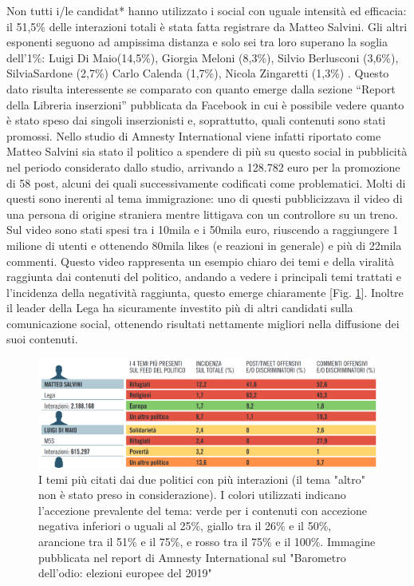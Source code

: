 Non tutti i/le candidat* hanno utilizzato i social con uguale intensità ed efficacia: il 51,5\% delle interazioni totali è stata fatta registrare da Matteo Salvini. Gli altri esponenti seguono ad ampissima distanza e solo sei tra loro superano la soglia dell’1\%: Luigi Di Maio(14,5\%), Giorgia Meloni (8,3\%), Silvio Berlusconi (3,6\%), SilviaSardone (2,7\%) Carlo Calenda (1,7\%), Nicola Zingaretti (1,3\%) . Questo dato risulta interessente se comparato con quanto emerge dalla sezione “Report della Libreria inserzioni” pubblicata da Facebook in cui è possibile vedere quanto è stato speso dai singoli inserzionisti e, soprattutto, quali contenuti sono stati promossi. Nello studio di Amnesty International viene infatti riportato come Matteo Salvini sia stato il politico a spendere di più su questo social in pubblicità nel periodo considerato dallo studio, arrivando a  128.782 euro per la promozione di 58 post, alcuni dei quali successivamente codificati come problematici. Molti di questi sono inerenti al tema immigrazione: uno di questi pubblicizzava il video di una persona di origine straniera mentre littigava con un controllore su un treno. Sul video sono stati spesi tra i 10mila e i 50mila euro, riuscendo a raggiungere 1 milione di utenti e ottenendo 80mila likes (e reazioni in generale) e più di 22mila commenti. Questo video rappresenta un esempio chiaro dei temi e della viralità raggiunta dai contenuti del politico, andando a vedere i principali temi trattati e l'incidenza della negatività raggiunta, questo emerge chiaramente [Fig. \ref{fig:amnpol}]. Inoltre il leader della Lega ha sicuramente investito più di altri candidati sulla comunicazione social, ottenendo risultati nettamente migliori nella diffusione dei suoi contenuti.
\begin{figure}
	\centering
	\includegraphics[width=\textwidth]{figures/amnpol}
	\caption{I temi più citati dai due politici con più interazioni (il tema "altro" non è stato preso in considerazione). I colori utilizzati indicano l’accezione prevalente del tema: verde per i contenuti con accezione negativa inferiori o uguali al 25\%, giallo tra il 26\% e il 50\%, arancione tra il 51\% e il 75\%, e rosso tra il 75\% e il 100\%. Immagine pubblicata nel report di Amnesty International sul "Barometro dell'odio: elezioni europee del 2019"}
	\label{fig:amnpol}
\end{figure}


